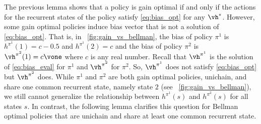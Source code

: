 The previous lemma shows that a policy is gain optimal if and only if the actions for the recurrent states of the policy satisfy \eqref{eq:bias_opt} for any $\vh^*$. %
However, some gain optimal policies induce bias vector that is not a solution of \eqref{eq:bias_opt}.
That is, in \figurename~\ref{fig:gain_vs_bellman}, the bias of policy $\pi^1$ is $h^{\pi^1}(1)=c-0.5$ and $h^{\pi^1}(2)=c$ and the bias of policy $\pi^2$ is $\vh^{\pi^2}(1)=c\vone$ where $c$ is any real number.
Recall that $\vh^{\pi^1}$ is the solution of \eqref{eq:bias_eval} for $\pi^1$ and $\vh^{\pi^2}$ for $\pi^2$.
So, $\vh^{\pi^1}$ does not satisfy \eqref{eq:bias_opt} but $\vh^{\pi^2}$ does.
While $\pi^1$ and $\pi^2$ are both gain optimal policies, unichain, and share one common recurrent state, namely state $2$ (see \figurename~\ref{fig:gain_vs_bellman}), we still cannot generalize the relationship between $h^{\pi^1}(s)$ and $h^{\pi^2}(s)$ for all states $s$.
In contrast, the following lemma clarifies this question for Bellman optimal policies that are unichain and share at least one common recurrent state.

